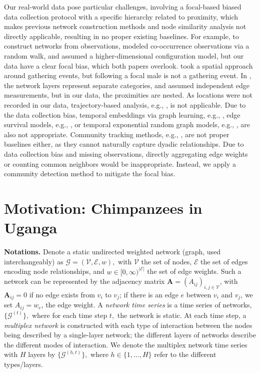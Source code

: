 \documentclass{article}
\theoremstyle{plain}
\theoremstyle{definition}
\theoremstyle{remark}
\begin{document}
Our real-world data pose particular challenges, involving a focal-based biased data collection protocol with a specific hierarchy related to proximity, which makes previous network construction methods and node similarity analysis not directly applicable, resulting in no proper existing baselines. For example, to construct networks from observations, \citet{rabbat2008network} modeled co-occurrence observations via a random walk, and \citet{casiraghi2017relational} assumed a higher-dimensional configuration model, but our data have a clear focal bias, which both papers overlook. \citet{psorakis2012inferring} took a spatial approach around gathering events, but following a focal male is not a gathering event. In \citet{abraham2015low}, the network layers represent separate categories, and \citet{newman2018network} assumed independent edge measurements, but in our data, the proximities are nested. As locations were not recorded in our data, trajectory-based analysis, e.g., \citet{han2021graph}, is not applicable. Due to the data collection bias, temporal embeddings via graph learning, e.g., \citet{haddad2019temporalnode2vec}, edge survival models, e.g., \citet{ccelikkanat2024continuous}, or temporal exponential random graph models, e.g., \citet{leifeld2019theoretical}, are also not appropriate. Community tracking methods, e.g.,  \citet{mazza2023modularity}, are not proper baselines either, as they cannot naturally capture dyadic relationships. Due to data collection bias and missing observations, directly aggregating edge weights or counting common neighbors would be inappropriate. Instead, we apply a community detection method to mitigate the focal bias. 
\section{Motivation: Chimpanzees in Uganga}
\label{sec:chimp_data_description}
\textbf{Notations.} Denote a static undirected weighted network (graph, used interchangeably) as $\mathcal{G}=(\mathcal{V}, \mathcal{E}, w),$ with $\mathcal{V}$ the set of nodes, $\mathcal{E}$ the set of edges encoding node relationships, and $w \in [0, \infty)^{| \mathcal{E}|}$ the set of edge weights. Such a network can be represented by the adjacency matrix $\mathbf{A} = (A_{ij})_{i,j \in \mathcal{V}}$,  
with $\mathbf{A}_{ij}=0$ if no edge exists from $v_i$ to $v_j$; if there is an edge $e$ between $v_i$ and $v_j$, we set $A_{ij} = w_{e}$, the edge weight. A \emph{network time series} is a time series of networks,  $\{\mathcal{G}^{(t)}\},$ where for each time step $t,$ the network is static. At each time step, a \emph{multiplex network} is constructed with each type of interaction between the nodes being described by a single-layer network; the different layers of networks describe the different modes of interaction.
We denote the multiplex network time series with $H$ layers by $\{\mathcal{G}^{(h, t)}\},$ where $h\in\{1, \dots, H\}$ refer to the different types/layers.
\end{document}
